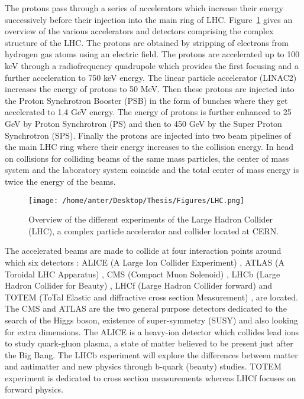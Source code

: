 The protons pass through a series of accelerators which increase their energy successively before their injection into the main ring of LHC. Figure~\ref{fig:LHC} gives an overview of the various accelerators and detectors comprising the complex structure of the LHC. The protons are obtained by stripping of electrons from hydrogen gas atoms using an electric field. The protons are accelerated up to 100 keV through a radiofrequency quadrupole which provides the first focusing and a further acceleration to 750 keV energy. The linear particle accelerator (LINAC2) increases the energy of protons to 50 MeV. Then these protons are injected into the Proton Synchrotron Booster (PSB) in the form of bunches where they get accelerated to 1.4 GeV energy. The energy of protons is further enhanced to 25 GeV by Proton Synchrotron (PS) and then to 450 GeV by the Super Proton Synchrotron (SPS). Finally the protons are injected into two beam pipelines of the main LHC ring where their energy increases to the collision energy. In head on collisions for colliding beams of the same mass particles, the center of mass system and the laboratory system coincide and the total center of mass energy is twice the energy of the beams. 

\begin{figure}[!h]
 \begin{center} 
 \hspace*{-5mm}
 \texttt{[image: /home/anter/Desktop/Thesis/Figures/LHC.png]}\\
 \vspace*{5mm}
 \caption[LHC]{Overview of the different experiments of the Large Hadron Collider (LHC), a complex particle accelerator and collider located at CERN\footnotemark.}
 \label{fig:LHC}
 \end{center}
\end{figure}

The accelerated beams are made to collide at four interaction points around which six detectors : ALICE (A Large Ion Collider Experiment) \cite{Aamodt:2008zz}, ATLAS (A Toroidal LHC Apparatus) \cite{Aad:2008zzm}, CMS (Compact Muon Solenoid) \cite{Chatrchyan:2008aa,Bayatian:2006nff,Ball:2007zza}, LHCb (Large Hadron Collider for Beauty) \cite{Alves:2008zz}, LHCf (Large Hadron Collider forward)\cite{Adriani:2008zz} and TOTEM (ToTal Elastic and diffractive cross section Measurement) \cite{Anelli:2008zza}, are located. The CMS and ATLAS are the two general purpose detectors dedicated to the search of the Higgs boson, existence of super-symmetry (SUSY) and also looking for extra dimensions. The ALICE is a heavy-ion detector which collides lead ions to study quark-gluon plasma, a state of matter believed to be present just after the Big Bang. The LHCb experiment will explore the differences between matter and antimatter and new physics through b-quark (beauty) studies. TOTEM experiment is dedicated to cross section measurements whereas LHCf focuses on forward physics. 

